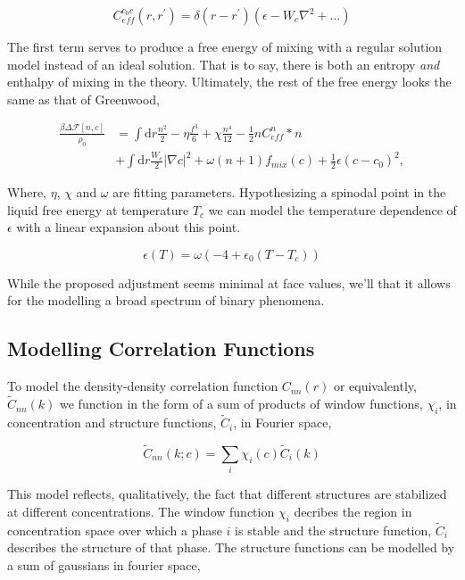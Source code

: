 \documentclass[showkeys, prb, reprint]{revtex4-1}
\newcommand{\F}{\mathcal{F}}
\renewcommand{\l}{\left}
\renewcommand{\r}{\right}
\newcommand{\f}{\frac}
\begin{document}
\begin{equation}
	C^{c_0 c}_{eff}(r, r^\prime) = \delta(r - r^\prime)\l(\epsilon  - W_c \nabla^2 + ... \r)
\end{equation}

The first term serves to produce a free energy of mixing with a regular solution model instead of an ideal solution. That is to say, there is both an entropy \textit{and} enthalpy of mixing in the theory. Ultimately, the rest of the free energy looks the same as that of Greenwood,

\begin{align}
	\f{\beta \Delta \F[n, c]}{\rho_0} &= \int \mathrm{d}r \f{n^2}{2} - \eta \f{f^3}{6} + \chi \f{n^4}{12} -\f{1}{2} n C^{n}_{eff} \ast n \\
	&+ \int \mathrm{d} r \f{W_c}{2} \l\vert\nabla c\r\vert^2 + \omega (n + 1) f_{mix}(c) + \f{1}{2} \epsilon (c- c_0)^2, \nonumber
\end{align}

Where, $\eta$, $\chi$ and $\omega$ are fitting parameters. Hypothesizing a spinodal point in the liquid free energy at temperature $T_c$ we can model the temperature dependence of $\epsilon$ with a linear expansion about this point. 

\begin{equation}
	\epsilon(T) = \omega \l( -4 + \epsilon_0 \l(T - T_c\r)\r) 
\end{equation}

While the proposed adjustment seems minimal at face values, we'll that it allows for the modelling a broad spectrum of binary phenomena.

\subsection{Modelling Correlation Functions}

To model the density-density correlation function $C_{nn}(r)$ or equivalently, $\tilde{C}_{nn}(k)$ we function in the form of a sum of products of window functions, $\chi_i$, in concentration and structure functions, $\tilde{C}_i$, in Fourier space, 

\begin{equation}
  \tilde{C}_{nn}(k; c) = \sum_i \chi_i (c) \tilde{C}_i (k)
\end{equation}

This model reflects, qualitatively, the fact that different structures are
stabilized at different concentrations. The window function $\chi_i$ decribes
the region in concentration space over which a phase $i$ is stable and the
structure function, $\tilde{C}_i$ describes the structure of that phase. The
structure functions can be modelled by a sum of gaussians in fourier space, 
\end{document}

